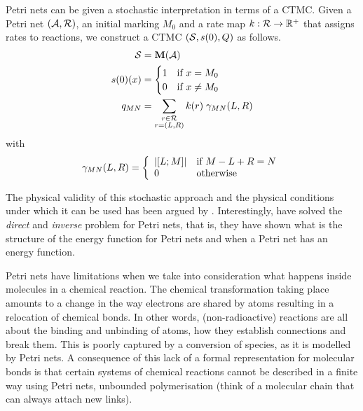 Petri nets can be given a stochastic interpretation
in terms of a CTMC.
Given a Petri net $\left(\mathcal{A}, \mathcal{R}\right)$,
an initial marking $M_0$ and
a rate map $k: \mathcal{R} \to \mathbb{R}^+$ that assigns rates to reactions,
we construct a CTMC $\left(\mathcal{S}, s(0), Q\right)$ as follows.
\begin{align*}
  \mathcal{S} &= \mathbf{M}(\mathcal{A}) \\
  s(0)(x) &= \begin{cases}
    1 \quad\text{if } x = M_0 \\
    0 \quad\text{if } x \neq M_0
  \end{cases} \\
  q_{MN} &= \sum_{\substack{r \in \mathcal{R}\\r = \left(L,R\right)}}
    k(r) \; \gamma_{MN}(L,R)
\end{align*}
with
\begin{equation*}
  \gamma_{MN}(L,R) = \left\{\begin{array}{ll}
    \left\lvert \left[L;M\right] \right\rvert & \text{if } M - L + R = N \\
    0 & \text{otherwise}
  \end{array}\right.
\end{equation*}

The physical validity of this stochastic approach
and the physical conditions under which
it can be used has been argued by \citet{gillespie76}.
Interestingly, \citet{et2} have solved
the \emph{direct} and \emph{inverse} problem for Petri nets,
that is, they have shown what is the structure of the energy function
for Petri nets and when a Petri net has an energy function.

Petri nets have limitations when we take into consideration
what happens inside molecules in a chemical reaction.
The chemical transformation taking place amounts to
a change in the way electrons are shared by atoms
resulting in a relocation of chemical bonds.
In other words, (non-radioactive) reactions are all about
the binding and unbinding of atoms,
how they establish connections and break them.
This is poorly captured by a conversion of species,
as it is modelled by Petri nets.
A consequence of this lack of a formal representation for
molecular bonds is that certain systems of chemical reactions
cannot be described in a finite way using Petri nets,
\eg unbounded polymerisation
(think of a molecular chain that can always attach new links).

